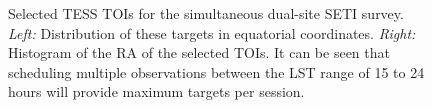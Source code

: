 \documentclass{aastex63}
\begin{document}
\begin{figure}
    \centering
    \centering
    \caption{Selected TESS TOIs for the simultaneous dual-site SETI survey. {\itshape Left:} Distribution of these targets in equatorial coordinates. {\itshape Right:} Histogram of the RA of the selected TOIs. It can be seen that scheduling multiple observations between the LST range of 15 to 24 hours will provide maximum targets per session.}
    \label{fig:TESS_TOIs}
\end{figure}

\end{document}
